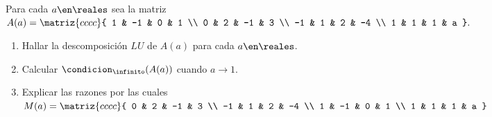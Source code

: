 \begin{enunciado}{\ejExtra}
  Para cada $a \en \reales$ sea la matriz
  $A(a) =
    \matriz{cccc}{
      1 & -1 & 0 & 1 \\
      0 & 2 & -1 & 3 \\
      -1 & 1 & 2 & -4 \\
      1 & 1 & 1 & a
    }.
  $

  \begin{enumerate}[label=\alph*)]
    \item Hallar la descomposición $LU$ de $A(a)$ para cada $a \en \reales$.
    \item Calcular $\condicion_\infinito(A(a))$ cuando $a \to 1$.
    \item Explicar las razones por las cuales
          $M(a) =
            \matriz{cccc}{
              0 & 2 & -1 & 3 \\
              -1 & 1 & 2 & -4 \\
              1 & -1 & 0 & 1 \\
              1 & 1 & 1 & a
            }
          $
  \end{enumerate}
\end{enunciado}

